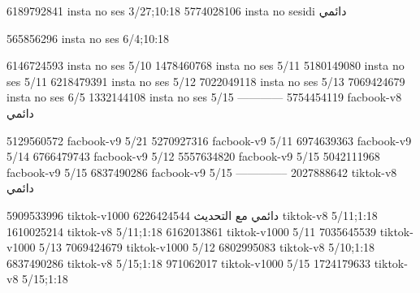 
6189792841 insta no ses
3/27;10:18
5774028106 insta no sesidi
دائمي


565856296 insta no ses
6/4;10:18


6146724593 insta no ses
5/10
1478460768 insta no ses
5/11
5180149080 insta no ses
5/11
6218479391 insta no ses
5/12
7022049118 insta no ses
5/13
7069424679 insta no ses
6/5
1332144108 insta no ses
5/15
------------
5754454119 facbook-v8
دائمي

5129560572 facbook-v9
5/21
5270927316 facbook-v9
5/11
6974639363 facbook-v9
5/14
6766479743 facbook-v9
5/12
5557634820 facbook-v9
5/15
5042111968 facbook-v9
5/15
6837490286 facbook-v9
5/15
--------------
2027888642 tiktok-v8
دائمي

5909533996 tiktok-v1000
دائمي مع التحديث
6226424544 tiktok-v8
5/11;1:18
1610025214 tiktok-v8
5/11;1:18
6162013861 tiktok-v1000
5/11
7035645539 tiktok-v1000
5/13
7069424679 tiktok-v1000
5/12
6802995083 tiktok-v8
5/10;1:18
6837490286 tiktok-v8
5/15;1:18
971062017 tiktok-v1000
5/15
1724179633 tiktok-v8
5/15;1:18
